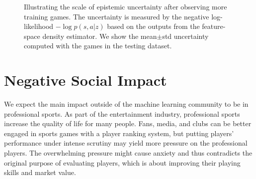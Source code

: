 \documentclass{article}
\newcommand{\state}{s}
\newcommand{\action}{a}
\newcommand{\dataset}{\mathcal{D}}
\begin{document}
\begin{figure}[htbp]
\begin{minipage}[t]{0.50\textwidth}
    \captionsetup{width=.95\linewidth}
\end{minipage}
\caption{Illustrating the scale of epistemic uncertainty after observing more training games. The uncertainty is measured by the negative log-likelihood $-\log p(\state,\action|z)$ based on the outputs from the feature-space density estimator. We show the mean$\pm$std uncertainty computed with the games in the testing dataset.}
\label{fig:uncertainty-by-games}
\end{figure}



\section{Negative Social Impact}
We expect the main impact outside of the machine learning community to be in professional sports. As part of the entertainment industry, professional sports increase the quality of life for many people. Fans, media, and clubs can be better engaged in sports games with a player ranking system, but putting players’ performance under intense scrutiny may yield more pressure on the professional players. The overwhelming pressure might cause anxiety and thus contradicts the original purpose of evaluating players, which is about improving their playing skills and market value.


\end{document}
